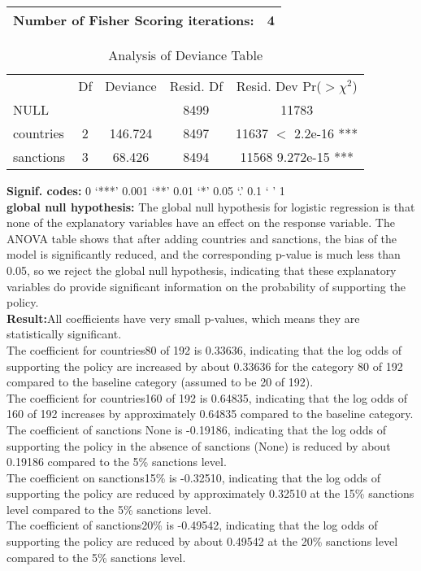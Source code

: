 \documentclass[12pt,letterpaper]{article}
\begin{document}
\begin{enumerate}
\begin{tabular}{ll}
		Number of Fisher Scoring iterations: & 4 \\
		\hline
	\end{tabular}

	
	\begin{table}[ht]
		\centering
	
			\caption{Analysis of Deviance Table}
		\begin{tabular}{lcccc}
			\hline
			& Df & Deviance & Resid. Df & Resid. Dev  Pr($>\chi^2$) \\
		
			NULL & & & 8499 & 11783 \\
			countries & 2 & 146.724 & 8497 & 11637  $<$ 2.2e-16 *** \\
			sanctions & 3 & 68.426 & 8494 & 11568  9.272e-15 *** \\
			\hline
		\end{tabular}
	
	\end{table}
	
	\textbf{Signif. codes:} 0 ‘***’ 0.001 ‘**’ 0.01 ‘*’ 0.05 ‘.’ 0.1 ‘ ’ 1\\

	\textbf{global null hypothesis:} The global null hypothesis for logistic regression is that none of the explanatory variables have an effect on the response variable. The ANOVA table shows that after adding countries and sanctions, the bias of the model is significantly reduced, and the corresponding p-value is much less than 0.05, so we reject the global null hypothesis, indicating that these explanatory variables do provide significant information on the probability of supporting the policy.\\
	
	\textbf{Result:}All coefficients have very small p-values, which means they are statistically significant.\\
	The coefficient for countries80 of 192 is 0.33636, indicating that the log odds of supporting the policy are increased by about 0.33636 for the category 80 of 192 compared to the baseline category (assumed to be 20 of 192).\\
	The coefficient for countries160 of 192 is 0.64835, indicating that the log odds of 160 of 192 increases by approximately 0.64835 compared to the baseline category.\\
	The coefficient of sanctions None is -0.19186, indicating that the log odds of supporting the policy in the absence of sanctions (None) is reduced by about 0.19186 compared to the 5\% sanctions level.\\
	The coefficient on sanctions15\% is -0.32510, indicating that the log odds of supporting the policy are reduced by approximately 0.32510 at the 15\% sanctions level compared to the 5\% sanctions level.\\
	The coefficient of sanctions20\% is -0.49542, indicating that the log odds of supporting the policy are reduced by about 0.49542 at the 20\% sanctions level compared to the 5\% sanctions level.
	

\end{enumerate}
\end{document}
